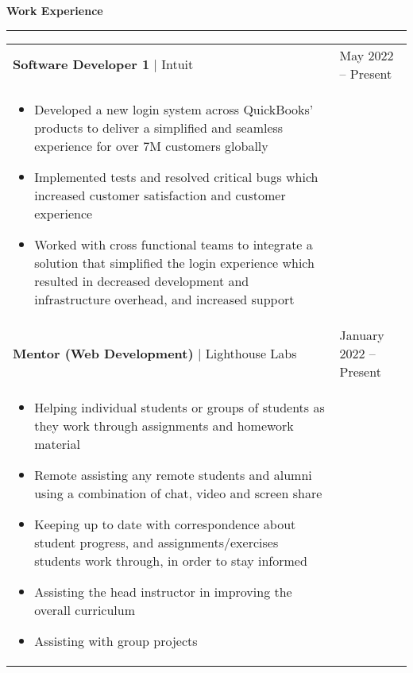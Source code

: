 \documentclass[11pt]{article}
\newenvironment{compactList}
{
  \begin{itemize}
    \setlength{\itemsep}{0pt}
    \setlength{\parskip}{0pt}
}
{\end{itemize}}
\begin{document}
\begin{center}
  \textbf{Work Experience}
  \noindent\rule[10pt]{0.9\paperwidth}{0.4pt}
\end{center}
\vspace{-20pt}
\begin{tabularx}{\textwidth\setlength{\extrarowheight}{5pt}}
  {
    >{\hsize=1.5\hsize\raggedright\arraybackslash}X
    >{\hsize=0.5\hsize\raggedleft\arraybackslash}X
  }
  \textbf{Software Developer 1} $\vert$ Intuit                            & May 2022 – Present     \\
  \multicolumn{2}{>{\hsize=\dimexpr2\hsize+2\tabcolsep+\arrayrulewidth\relax}X}
  {
    \begin{minipage}{0.85\paperwidth}
      \begin{compactList}
        \item Developed a new login system across QuickBooks' products to deliver a simplified and seamless experience for over 7M customers globally
        \item Implemented tests and resolved critical bugs which increased customer satisfaction and customer experience
        \item Worked with cross functional teams to integrate a solution that simplified the login experience which resulted in decreased development and infrastructure overhead, and increased support
      \end{compactList}
    \end{minipage}
  }
  \\
  \textbf{Mentor (Web Development)} $\vert$ Lighthouse Labs               & January 2022 – Present \\
  \multicolumn{2}{>{\hsize=\dimexpr2\hsize+2\tabcolsep+\arrayrulewidth\relax}X}
  {
    \begin{minipage}{0.85\paperwidth}
      \begin{compactList}
        \item Helping individual students or groups of students as they work through assignments and homework material
        \item Remote assisting any remote students and alumni using a combination of chat, video and screen share
        \item Keeping up to date with correspondence about student progress, and assignments/exercises students work through, in order to stay informed
        \item Assisting the head instructor in improving the overall curriculum
        \item Assisting with group projects

\end{compactList}
\end{minipage}}
\end{tabularx}
\end{document}
